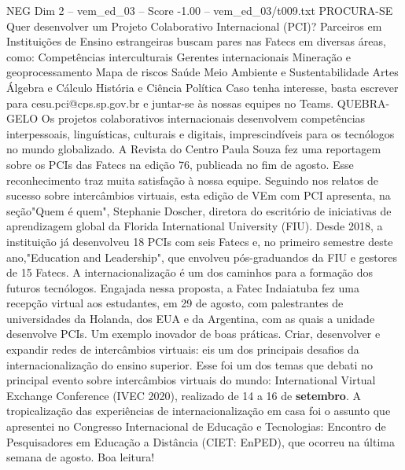\begin{textsample}{NEG Dim 2 – vem\_ed\_03 – Score -1.00 – vem\_ed\_03/t009.txt}  \label{ex:f2_neg_012}
PROCURA-SE Quer desenvolver um Projeto Colaborativo Internacional (PCI)?
Parceiros em Instituições de Ensino estrangeiras buscam pares nas Fatecs em diversas áreas, como: Competências interculturais Gerentes internacionais Mineração e geoprocessamento Mapa de riscos Saúde Meio Ambiente e Sustentabilidade Artes Álgebra e Cálculo História e Ciência Política Caso tenha interesse, basta escrever para cesu.pci@cps.sp.gov.br e juntar-se às nossas equipes no Teams.
QUEBRA-GELO Os projetos colaborativos internacionais desenvolvem competências interpessoais, linguísticas, culturais e digitais, imprescindíveis para os tecnólogos no mundo globalizado.
A Revista do Centro Paula Souza fez uma reportagem sobre os PCIs das Fatecs na edição 76, publicada no fim de agosto.
Esse reconhecimento traz muita satisfação à nossa equipe.
Seguindo nos relatos de sucesso sobre intercâmbios virtuais, esta edição de VEm com PCI apresenta, na seção"Quem é quem", Stephanie Doscher, diretora do escritório de iniciativas de aprendizagem global da Florida International University (FIU).
Desde 2018, a instituição já desenvolveu 18 PCIs com seis Fatecs e, no primeiro semestre deste ano,"Education and Leadership", que envolveu pós-graduandos da FIU e gestores de 15 Fatecs.
A internacionalização é um dos caminhos para a formação dos futuros tecnólogos.
Engajada nessa proposta, a Fatec Indaiatuba fez uma recepção virtual aos estudantes, em 29 de agosto, com palestrantes de universidades da Holanda, dos EUA e da Argentina, com as quais a unidade desenvolve PCIs.
Um exemplo inovador de boas práticas.
Criar, desenvolver e expandir redes de intercâmbios virtuais: eis um dos principais desafios da internacionalização do ensino superior.
Esse foi um dos temas que debati no principal evento sobre intercâmbios virtuais do mundo: International Virtual Exchange Conference (IVEC 2020), realizado de 14 a 16 de \textbf{setembro}.
A tropicalização das experiências de internacionalização em casa foi o assunto que apresentei no Congresso Internacional de Educação e Tecnologias: Encontro de Pesquisadores em Educação a Distância (CIET: EnPED), que ocorreu na última semana de agosto.
Boa leitura!

\end{textsample}
